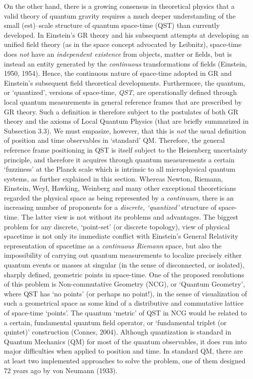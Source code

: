 \documentclass[12pt]{article}
\theoremstyle{plain}
\theoremstyle{definition}
\numberwithin{equation}{section}
\begin{document}
    On the other hand, there is a growing consensus in theoretical physics that 
a valid theory of quantum gravity requires a much deeper understanding of the 
small (est)--scale structure of quantum space-time (QST) than currently 
developed. In Einstein's GR theory and his subsequent attempts at developing an 
unified field theory (as in the space concept advocated by Leibnitz), space-time 
does \emph{not} have an \emph{independent existence} from objects, matter or 
fields, but is instead an entity generated by the \emph{continuous} 
transformations of fields \cite{Einstein} (Einstein, 1950, 1954). Hence, the 
continuous nature of space-time adopted in GR and Einstein's subsequent field theoretical 
developments. Furthermore, the quantum, or `quantized', versions of space-time, \emph{QST}, 
are operationally defined through local quantum measurements in general reference frames that 
are prescribed by GR theory. Such a definition is therefore subject to the postulates of both 
GR theory and the axioms of Local Quantum Physics (that are briefly summarized in Subsection 
3.3). We must empasize, however, that this is \emph{not} the usual definition of position and 
time observables in `standard' QM. Therefore, the general reference frame positioning in QST 
is itself subject to the Heisenberg uncertainty principle, and therefore it acquires through 
quantum measurements a certain `fuzziness' at the Planck scale which is intrinsic to  all 
microphysical quantum systems, as further explained in this section.  Whereas Newton, Riemann, 
Einstein, Weyl, Hawking, Weinberg and many other exceptional theoreticians regarded the 
physical space as being represented by a \emph{continuum}, there is an increasing number of 
proponents for a \emph{discrete, `quantized'} structure of space-time. The latter view is not 
without its problems and advantages. The biggest problem for any discrete, `point-set' (or 
discrete topology), view of physical spacetime is not only its immediate conflict with 
Einstein's General Relativity representation of spacetime as a \emph{continuous Riemann} space, but also the 
impossibility of carrying out quantum measurements to localize precisely either quantum events 
or masses at singular (in the sense of disconnected, or isolated), sharply defined, geometric 
points in space-time. One of the proposed resolutions of this problem is Non-commutative 
Geometry (NCG), or `Quantum Geometry', where QST has `no points' (or perhaps no point!), in 
the sense of visualization of such a geometrical space as some kind of a distributive and commutative 
lattice of space-time `points'.  The quantum `metric' of QST in NCG would be related to a 
certain, fundamental quantum field operator, or `fundamental triplet (or quintet)' 
construction (Connes, 2004).  Although quantization is standard in Quantum Mechanics (QM) for 
most of the quantum observables, it does run into major difficulties when applied to position 
and time. In standard QM, there are at least two implemented approaches to solve the problem, 
one of them designed 72 years ago by von Neumann (1933). 
\bigbreak
\end{document}
